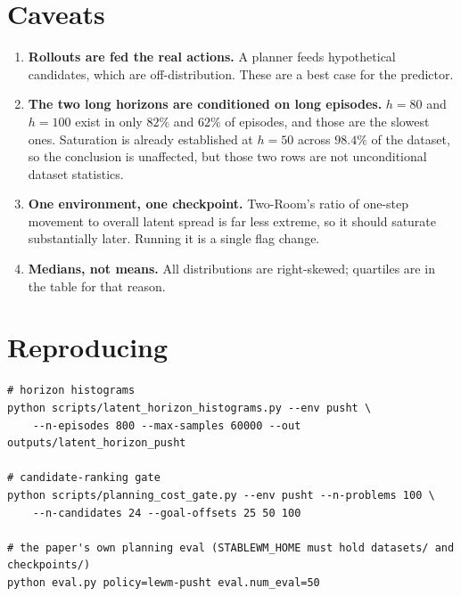 \documentclass[11pt]{article}
\begin{document}
\section{Caveats}

\begin{enumerate}[leftmargin=1.4em,itemsep=3pt]
\item \textbf{Rollouts are fed the real actions.} A planner feeds hypothetical candidates,
which are off-distribution. These are a best case for the predictor.
\item \textbf{The two long horizons are conditioned on long episodes.} $h{=}80$ and $h{=}100$
exist in only $82\%$ and $62\%$ of episodes, and those are the slowest ones. Saturation is
already established at $h{=}50$ across $98.4\%$ of the dataset, so the conclusion is
unaffected, but those two rows are not unconditional dataset statistics.
\item \textbf{One environment, one checkpoint.} Two-Room's ratio of one-step movement to
overall latent spread is far less extreme, so it should saturate substantially later. Running
it is a single flag change.
\item \textbf{Medians, not means.} All distributions are right-skewed; quartiles are in the
table for that reason.
\end{enumerate}

\section{Reproducing}

\begin{verbatim}
# horizon histograms
python scripts/latent_horizon_histograms.py --env pusht \
    --n-episodes 800 --max-samples 60000 --out outputs/latent_horizon_pusht

# candidate-ranking gate
python scripts/planning_cost_gate.py --env pusht --n-problems 100 \
    --n-candidates 24 --goal-offsets 25 50 100

# the paper's own planning eval (STABLEWM_HOME must hold datasets/ and checkpoints/)
python eval.py policy=lewm-pusht eval.num_eval=50
\end{verbatim}
\end{document}
